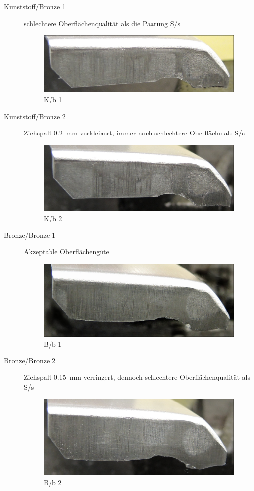 \documentclass[12pt,a4paper,parskip]{scrartcl}
\begin{document}
\begin{description}
\item[Kunststoff/Bronze 1] schlechtere Oberflächenqualität als die Paarung S/s
\begin{figure}[H]
\centering
\includegraphics[width=.8\textwidth]{Kb1a}
\caption{K/b 1}
\label{fig:Kb1a}
\end{figure}

\item[Kunststoff/Bronze 2] Ziehspalt \SI{0.2}{\milli\meter} verkleinert, immer noch schlechtere Oberfläche als S/s
\begin{figure}[H]
\centering
\includegraphics[width=.8\textwidth]{Kb2}
\caption{K/b 2}
\label{fig:Kb2}
\end{figure}

\item[Bronze/Bronze 1] Akzeptable Oberflächengüte
\begin{figure}[H]
\centering
\includegraphics[width=.8\textwidth]{Bb1}
\caption{B/b 1}
\label{fig:Bb1}
\end{figure}

\item[Bronze/Bronze 2] Ziehspalt \SI{0.15}{\milli\meter} verringert,  dennoch schlechtere Oberflächenqualität als S/s
\begin{figure}[H]
\centering
\includegraphics[width=.8\textwidth]{Bb2}
\caption{B/b 2}
\label{fig:Bb2}
\end{figure}


\end{description}
\end{document}
